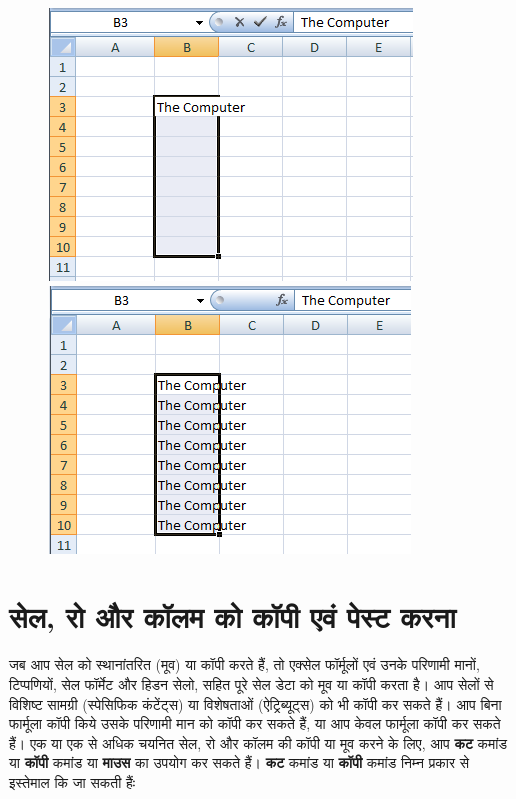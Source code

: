 \begin{figure}[H]
\centering
\includegraphics[scale=0.4]{src/images/chapter1/chapter1_fig50.png}\qquad
\includegraphics[scale=0.4]{src/images/chapter1/chapter1_fig51.png}
\end{figure}									

\section{सेल, रो और कॉलम को कॉपी एवं पेस्ट करना}\label{id-1.33}

जब आप सेल को स्थानांतरित (मूव) या कॉपी करते हैं, तो एक्सेल फॉर्मूलों एवं उनके परिणामी मानों, टिप्पणियों, सेल फॉर्मेट और हिडन सेलो, सहित पूरे सेल डेटा को मूव या कॉपी करता है। आप सेलों से विशिष्ट सामग्री (स्पेसिफिक कंटेंट्स) या विशेषताओं (ऐट्रिब्यूट्स) को भी कॉपी कर सकते हैं। आप बिना फार्मूला कॉपी किये उसके परिणामी मान को कॉपी कर सकते हैं, या आप केवल फार्मूला कॉपी कर सकते हैं। एक या एक से अधिक चयनित सेल, रो और कॉलम की कॉपी या मूव करने के लिए, आप \textbf{कट} कमांड या \textbf{कॉपी} कमांड या \textbf{माउस} का उपयोग कर सकते हैं। \textbf{कट} कमांड या \textbf{कॉपी} कमांड निम्न प्रकार से इस्तेमाल कि जा सकती हैंः

